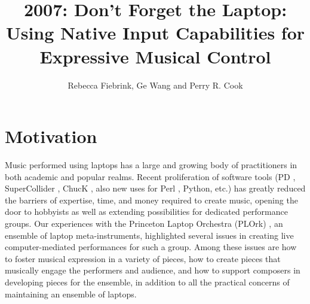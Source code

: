
\graphicspath{ {mainmatter/Fiebrink_2007/} }
\title*{2007: Don't Forget the Laptop: Using Native Input Capabilities for Expressive Musical Control}
\author{Rebecca Fiebrink, Ge Wang and Perry R. Cook}

%
%
\maketitle



\section{Motivation}
Music performed using laptops has a large and growing body of practitioners in
both academic and popular realms. Recent proliferation of software tools (PD \cite{Puckette:1996},
SuperCollider \cite{McCartney:1996}, ChucK \cite{Wang:2003}, also new uses for Perl \cite{McLean:2004}, Python, etc.) has
greatly reduced the barriers of expertise, time, and money required to create
music, opening the door to hobbyists as well as extending possibilities for
dedicated performance groups. Our experiences with the Princeton Laptop Orchestra
(PLOrk) \cite{Trueman:2006}, an ensemble of laptop meta-instruments, highlighted several issues
in creating live computer-mediated performances for such a group. Among these
issues are how to foster musical expression in a variety of pieces, how to create
pieces that musically engage the performers and audience, and how to support
composers in developing pieces for the ensemble, in addition to all the practical
concerns of maintaining an ensemble of laptops.


